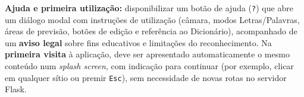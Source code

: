 


%


        \item \textbf{Ajuda e primeira utilização:} disponibilizar um botão de ajuda
        (\texttt{?}) que abre um diálogo modal com instruções de utilização (câmara,
        modos Letras/Palavras, áreas de previsão, botões de edição e referência ao
        Dicionário), acompanhado de um \textbf{aviso legal} sobre fins educativos e
        limitações do reconhecimento. Na \textbf{primeira visita} à aplicação, deve ser
        apresentado automaticamente o mesmo conteúdo num \textit{splash screen}, com
        indicação para continuar (por exemplo, clicar em qualquer sítio ou premir
        \texttt{Esc}), sem necessidade de novas rotas no servidor Flask.


